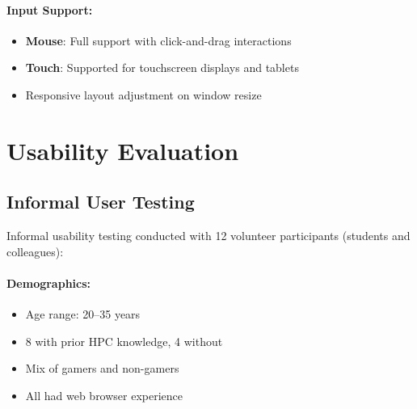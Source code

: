 \paragraph*{Input Support:}

\begin{itemize}
    \item \textbf{Mouse}: Full support with click-and-drag interactions
    \item \textbf{Touch}: Supported for touchscreen displays and tablets
    \item Responsive layout adjustment on window resize
\end{itemize}

\section{Usability Evaluation}
\label{sec:usability-evaluation}

\subsection{Informal User Testing}
\label{subsec:informal-testing}

Informal usability testing conducted with 12 volunteer participants (students and colleagues):

\paragraph*{Demographics:}
\begin{itemize}
    \item Age range: 20--35 years
    \item 8 with prior HPC knowledge, 4 without
    \item Mix of gamers and non-gamers
    \item All had web browser experience
\end{itemize}

